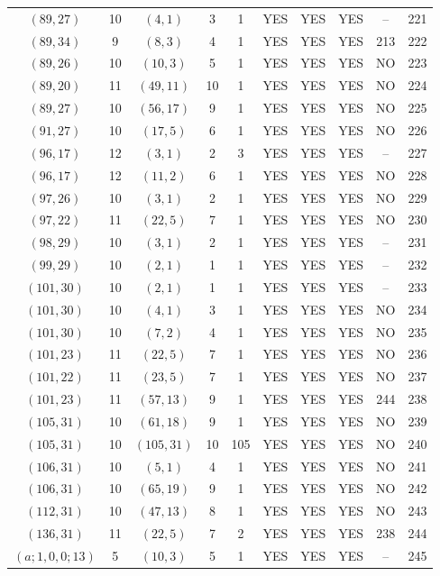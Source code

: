 \begin{longtable}{|c|c|c|c|c|c|c|c|c|c|}
$(89, 27)$ & 10 & $(4, 1)$ & 3 & 1 & YES & YES & YES & -- & 221\\
$(89, 34)$ & 9 & $(8, 3)$ & 4 & 1 & YES & YES & YES & 213 & 222\\
$(89, 26)$ & 10 & $(10, 3)$ & 5 & 1 & YES & YES & YES & NO & 223\\
$(89, 20)$ & 11 & $(49, 11)$ & 10 & 1 & YES & YES & YES & NO & 224\\
$(89, 27)$ & 10 & $(56, 17)$ & 9 & 1 & YES & YES & YES & NO & 225\\
$(91, 27)$ & 10 & $(17, 5)$ & 6 & 1 & YES & YES & YES & NO & 226\\
$(96, 17)$ & 12 & $(3, 1)$ & 2 & 3 & YES & YES & YES & -- & 227\\
$(96, 17)$ & 12 & $(11, 2)$ & 6 & 1 & YES & YES & YES & NO & 228\\
$(97, 26)$ & 10 & $(3, 1)$ & 2 & 1 & YES & YES & YES & NO & 229\\
$(97, 22)$ & 11 & $(22, 5)$ & 7 & 1 & YES & YES & YES & NO & 230\\
$(98, 29)$ & 10 & $(3, 1)$ & 2 & 1 & YES & YES & YES & -- & 231\\
$(99, 29)$ & 10 & $(2, 1)$ & 1 & 1 & YES & YES & YES & -- & 232\\
$(101, 30)$ & 10 & $(2, 1)$ & 1 & 1 & YES & YES & YES & -- & 233\\
$(101, 30)$ & 10 & $(4, 1)$ & 3 & 1 & YES & YES & YES & NO & 234\\
$(101, 30)$ & 10 & $(7, 2)$ & 4 & 1 & YES & YES & YES & NO & 235\\
$(101, 23)$ & 11 & $(22, 5)$ & 7 & 1 & YES & YES & YES & NO & 236\\
$(101, 22)$ & 11 & $(23, 5)$ & 7 & 1 & YES & YES & YES & NO & 237\\
$(101, 23)$ & 11 & $(57, 13)$ & 9 & 1 & YES & YES & YES & 244 & 238\\
$(105, 31)$ & 10 & $(61, 18)$ & 9 & 1 & YES & YES & YES & NO & 239\\
$(105, 31)$ & 10 & $(105, 31)$ & 10 & 105 & YES & YES & YES & NO & 240\\
$(106, 31)$ & 10 & $(5, 1)$ & 4 & 1 & YES & YES & YES & NO & 241\\
$(106, 31)$ & 10 & $(65, 19)$ & 9 & 1 & YES & YES & YES & NO & 242\\
$(112, 31)$ & 10 & $(47, 13)$ & 8 & 1 & YES & YES & YES & NO & 243\\
$(136, 31)$ & 11 & $(22, 5)$ & 7 & 2 & YES & YES & YES & 238 & 244\\
$(a; 1, 0, 0; 13)$ & 5 & $(10, 3)$ & 5 & 1 & YES & YES & YES & -- & 245\\

\end{longtable}
